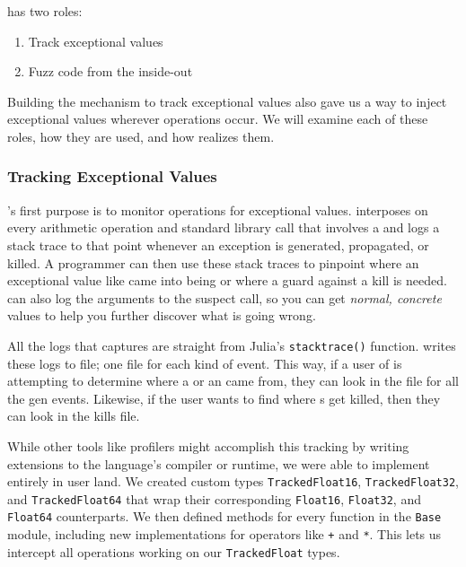 \documentclass{juliacon}
\begin{document}
\FT{} has two roles:

\begin{enumerate}
  \item Track exceptional values
  \item Fuzz \fp{} code from the inside-out
\end{enumerate}

Building the mechanism to track exceptional values also gave us a way to inject exceptional values wherever \fp{} operations occur.
We will examine each of these roles, how they are used, and how \FT{} realizes them.


\subsubsection{Tracking Exceptional Values}
\label{s:trackingexceptionalvalues}

\FT{}'s first purpose is to monitor \fp{} operations for exceptional values.
\FT{} interposes on every arithmetic operation and standard library call that involves a \fp{} and logs a stack trace to that point whenever an exception is generated, propagated, or killed.
A programmer can then use these stack traces to pinpoint where an exceptional value like \NaN{} came into being or where a guard against a \NaN{} kill is needed.
\FT{} can also log the arguments to the suspect call, so you can get \emph{normal, concrete} values to help you further discover what is going wrong.

All the logs that \FT{} captures are straight from Julia's \texttt{stacktrace()} function.
\FT{} writes these logs to file; one file for each kind of event.
This way, if a user of \FT{} is attempting to determine where a \NaN{} or an \Inf{} came from, they can look in the file for all the gen events.
Likewise, if the user wants to find where \NaN{}s get killed, then they can look in the kills file.


While other tools like profilers might accomplish this tracking by writing extensions to the language's compiler or runtime, we were able to implement \FT{} entirely in user land.
We created custom types \texttt{TrackedFloat16}, \texttt{TrackedFloat32}, and \texttt{TrackedFloat64} that wrap their corresponding \texttt{Float16}, \texttt{Float32}, and \texttt{Float64} counterparts.
We then defined methods for every function in the \texttt{Base} module, including new implementations for operators like \texttt{+} and \texttt{*}.
This lets us intercept all \fp{} operations working on our \texttt{TrackedFloat} types.
\end{document}
